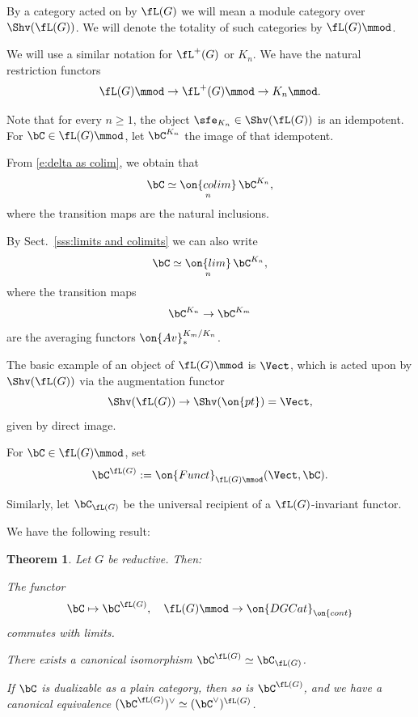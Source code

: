 \documentclass[9pt]{amsart}
\newtheorem{thm}[subsubsection]{Theorem}
\theoremstyle{definition}
\theoremstyle{remark}
\newcommand{\secref}[1]{Sect.~\ref{#1}}
\numberwithin{equation}{section}
\begin{document}
  \label{ss:action on categ}

\sssec{}  \label{sss:action on categ}

By a category acted on by $\fL(G)$ we will mean a module category over $\Shv(\fL(G))$. We will denote the
totality of such categories by $\fL(G)\mmod$. 

\medskip

We will use a similar notation for $\fL^+(G)$ or $K_n$. We have the natural restriction functors
$$\fL(G)\mmod\to \fL^+(G)\mmod\to K_n\mmod.$$

\sssec{}

Note that for every $n\geq 1$, the object $\sfe_{K_n}\in \Shv(\fL(G))$ is an idempotent. For $\bC\in \fL(G)\mmod$,
let $\bC^{K_n}$ the image of that idempotent. 

\medskip

From \eqref{e:delta as colim}, we obtain that
$$\bC\simeq \underset{n}{\on{colim}}\, \bC^{K_n},$$
where the transition maps are the natural inclusions. 

\medskip

By \secref{sss:limits and colimits} we can also write
$$\bC\simeq \underset{n}{\on{lim}}\, \bC^{K_n},$$
where the transition maps 
$$\bC^{K_n}\to \bC^{K_m}$$
are the averaging functors $\on{Av}_*^{K_m/K_n}$. 

\sssec{}

The basic example of an object of $\fL(G)\mmod$ is $\Vect$, which is acted upon by $\Shv(\fL(G))$ via the 
augmentation functor
$$\Shv(\fL(G))\to \Shv(\on{pt})=\Vect,$$
given by direct image. 

\medskip

For $\bC\in \fL(G)\mmod$, set
$$\bC^{\fL(G)}:=\on{Funct}_{\fL(G)\mmod}(\Vect, \bC).$$

Similarly, let $\bC_{\fL(G)}$ be the universal recipient of a $\fL(G)$-invariant functor. 

\medskip

We have the following result: 

\begin{thm}  \label{t:coinvariants and limits, loop}
Let $G$ be reductive. Then:

\smallskip

 The functor
$$\bC\mapsto \bC^{\fL(G)}, \quad \fL(G)\mmod\to \on{DGCat}_{\on{cont}}$$
commutes with limits. 

\smallskip

 There exists a canonical isomorphism $\bC^{\fL(G)}\simeq \bC_{\fL(G)}$.


\smallskip

 If $\bC$ is dualizable as a plain category, then so is $\bC^{\fL(G)}$, and we have a 
canonical equivalence $(\bC^{\fL(G)})^\vee\simeq (\bC^\vee)^{\fL(G)}$. 

\end{thm} 
\end{document}
